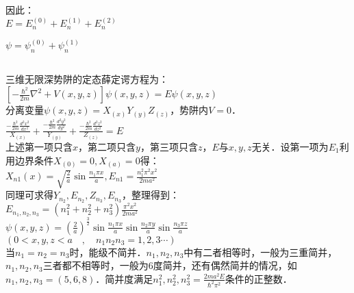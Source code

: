 因此：\\

$E = E^{(0)}_{n} + E^{(1)}_{n} + E^{(2)}_{n} $

$\psi = \psi^{(0)}_{n} + \psi^{(1)}_{n} $

\subsection{ }
三维无限深势阱的定态薛定谔方程为：\\

$\left[ -\frac{\hbar^{2}}{2m} \nabla^{2} +V(x,y,z) \right]\psi(x,y,z) = E\psi(x,y,z)$ \\

分离变量$\psi(x,y,z) = X_(x)Y_(y)Z_(z) $，势阱内$V=0$．\\

$\displaystyle \frac{-\frac{\hbar^{2}}{2m}\frac{d^{2} {x}^{2}}{d{x^{2}}}}{X_(x)} + \frac{-\frac{\hbar^{2}}{2m}\frac{d^{2} {y}^{2}}{d{y^{2}}}}{Y_(y)} + \frac{-\frac{\hbar^{2}}{2m}\frac{d^{2} {z}^{2}}{d{z^{2}}}}{Z_(z)} = E$ \\

上述第一项只含$x$，第二项只含$y$，第三项只含$z$，$E$与$x,y,z$无关．设第一项为$E_1$利用边界条件$X_{(0)} = 0,X_{(a)} = 0$得：\\

$\displaystyle X_{n1}(x) = \sqrt{\frac{2}{a}} \sin{\frac{n_{1} \pi x}{a}},E_{n1} = \frac{n^2_1 \pi^2 x^2}{2ma^2} $ \\

同理可求得$Y_{n_2},E_{n_2},Z_{n_3},E_{n_3} $，整理得到：\\

$\displaystyle E_{n_1,n_2,n_3} =(n^2_1 + n^2_2 + n^2_3)\frac{\pi^2 x^2}{2ma^2} $ \\

$\displaystyle \psi(x,y,z) = (\frac{2}{a})^{\frac{3}{2}} \sin{\frac{n_1 \pi x}{a}} \sin{\frac{n_2 \pi y}{a}} \sin{\frac{n_3 \pi z}{a}} $ \\

$(0<x,y,z<a \quad , \quad n_1 n_2 n_3 = 1,2,3 \cdots)$ \\

当$n_1 = n_2 = n_3$时，能级不简并．$n_1 , n_2 , n_3 $中有二者相等时，一般为三重简并，$n_1 , n_2 , n_3 $三者都不相等时，一般为6度简并，还有偶然简并的情况，如$n_1 , n_2 , n_3 =(5,6,8) $．简并度满足$\displaystyle n^2_1 , n^2_2 , n^2_3 = \frac{2ma^2 E}{\hbar^2 \pi^2}$条件的正整数．


